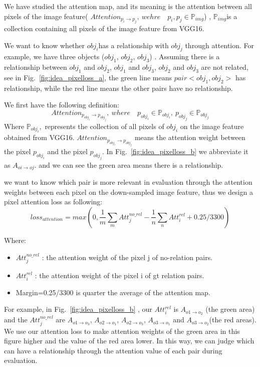 We have studied the attention map, and its meaning is the attention between all pixels of the image feature( $ Attention_{p_i\to p_j}, \  wehre \quad p_i,p_j\in \mathbb{P}_{img} $) , $ \mathbb{P}_{img}  $is a collection containing all pixels of the image feature from VGG16.

We want to know whether $ obj_i  $has a relationship with $ obj_j$ through attention. For example, we have three objects ($ obj_1 $, $ obj_2 $, $ obj_3 $) . Assuming there is a relationship between $ obj_1 $ and $ obj_2 $, $ obj_1 $ and $ obj_3 $, $ obj_2 $ and $ obj_3 $ are not related, see in Fig.~\ref{fig:idea_pixelloss_a}, the green line means $ pair <obj_1,obj_2> $ has relationship, while the red line means the other pairs have no relationship. 

We first have the following definition: 
$$ Attention_{p_{obj_i}\to p_{obj_j}},\ where \quad p_{obj_i} \in \mathbb{P}_{obj_i},\  p_{obj_j} \in \mathbb{P}_{obj_j} $$
Where $ \mathbb{P}_{obj_i}, $ represents the collection of all pixels of $ obj_i $ on the image feature obtained from VGG16. $  Attention_{p_{obj_i}\to p_{obj_j}} $ means the attention weight between the pixel $ p_{obj_i} $ and the pixel $ p_{obj_j} $. In Fig.~\ref{fig:idea_pixelloss_b} we abbreviate it as $ A_{oi \to oj} $. and we can see the green area means there is a relationship.



we want to know which pair is more relevant in evaluation through the attention weights between each pixel on the down-sampled image feature, thus we design a pixel attention loss as following:
\begin{equation}\label{pixel_attention_loss}
	loss_{attention}=max(0, \frac{1}{m}\sum_{m}Att_j^{no\_rel}-\frac{1}{n}\sum_{n}Att_i^{rel}+0.25
	/3300)
\end{equation}

Where:

\begin{itemize}
	\item $ Att_j^{no\_rel} $ : the attention weight of the pixel j of no-relation pairs.
	\item $ Att_i^{rel} $ :  the attention weight of the pixel i of gt relation pairs.
	\item Margin=0.25/3300 is quarter the average of the attention map.
\end{itemize}

For example, in Fig.~\ref{fig:idea_pixelloss_b} , our $Att_i^{rel} $  is $ A_{o1 \to o_2} $ (the green area) and  the $ Att_j^{no\_rel} $ are $ A_{o1 \to o_3}  $,  $ A_{o2 \to o_1}  $, $ A_{o2 \to o_3}  $, $ A_{o3 \to o_1}  $ and $ A_{o3\to o_2}  $(the red areas). We use our attention loss to make attention weights of the green area in this figure higher and the value of the red area lower. In this way, we can judge which can have a relationship through the attention value of each pair during evaluation.

